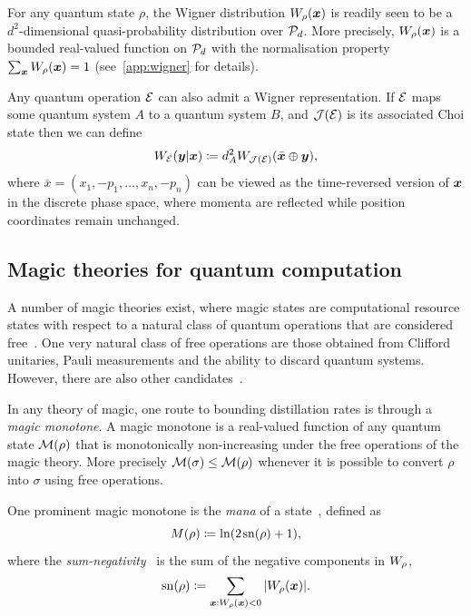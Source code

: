 \documentclass[pra,
aps,
twocolumn,
superscriptaddress,
groupedaddress,
nofootinbib,
reprint
]{revtex4-1}
\begin{document}
For any quantum state $\rho$, the Wigner distribution $W_\rho(\bmx)$ is readily seen to be a $d^2$-dimensional quasi-probability distribution over $\cal{P}_d$. More precisely, $W_\rho(\x)$ is a bounded real-valued function on $\P_d$ with the normalisation property $\sum_{\x} W_\rho(\bmx) = 1$ (see~\cref{app:wigner} for details).

Any quantum operation $\E$ can also admit a Wigner representation. If $\E$ maps some quantum system $A$ to a quantum system $B$, and $\J(\E)$ is its associated Choi state then we can define
\begin{equation}
W_{\E}(\y |\x) \coloneqq d_A^2 W_{\J(\E)}(\bar{\x} \oplus \y),
\end{equation}
where $\bar{x} =(x_1, -p_1, \dots , x_n, -p_n)$ can be viewed as the time-reversed version of $\x$ in the discrete phase space, where momenta are reflected while position coordinates remain unchanged.

\subsection{Magic theories for quantum computation}
\label{sec:mono}

A number of magic theories exist, where magic states are computational resource states with respect to a natural class of quantum operations that are considered free~\cite{Gour_2019}. One very natural class of free operations are those obtained from Clifford unitaries, Pauli measurements and the ability to discard quantum systems. However, there are also other candidates~\cite{cit:ahmadi, cit:seddon, Wang_2019}.

In any theory of magic, one route to bounding distillation rates is through a \emph{magic monotone}. A magic monotone is a real-valued function of any quantum state $\M(\rho)$ that is monotonically non-increasing under the free operations of the magic theory. More precisely $\M(\sigma) \le \M(\rho)$ whenever it is possible to convert $\rho$ into $\sigma$ using free operations.

One prominent magic monotone is the \emph{mana} of a state~\cite{cit:veitch2}, defined as
\begin{equation}
    \mana{\rho} \coloneqq \ln (2\hspace{1pt}\sn{\rho}+1),
\end{equation}
where the \emph{sum-negativity}~\cite{cit:veitch2} is the sum of the negative components in $\W{\rho}$,
\begin{equation}
    \sn{\rho} \coloneqq \sum\limits_{\bmx: \W[\bmx]{\rho} < 0} \abs{\W[\bmx]{\rho}}.
\end{equation}
\end{document}
